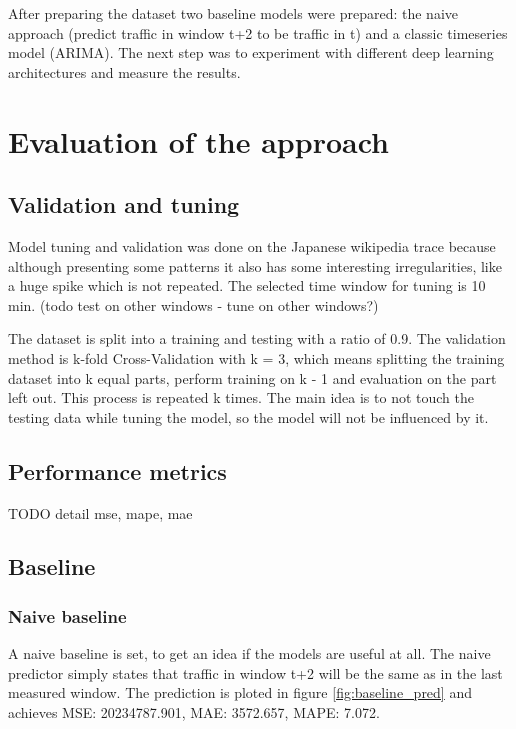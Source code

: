 \documentclass[12pt]{article}
\begin{document}
  After preparing the dataset two baseline models were prepared: the naive 
  approach (predict traffic in window t+2 to be traffic in t) and a classic 
  timeseries model (ARIMA). The next step was to experiment with different 
  deep learning architectures and measure the results.


  \section{Evaluation of the approach}
  \subsection{Validation and tuning}
  Model tuning and validation was done on the Japanese wikipedia trace because 
  although presenting some patterns it also has some interesting irregularities, 
  like a huge spike which is not repeated. The selected time window for tuning 
  is 10 min. (todo test on other windows - tune on other windows?)

  The dataset is split into a training and testing with a ratio of 0.9.
  The validation method is k-fold Cross-Validation\cite{kfold} with k = 3, 
  which means splitting the training dataset into k equal parts, perform training
  on k - 1 and evaluation on the part left out. This process is repeated k times.
  The main idea is to not touch the testing data while tuning the model, so the 
  model will not be influenced by it.

  \subsection{Performance metrics}
  TODO detail mse, mape, mae


  \subsection{Baseline}
  \subsubsection{Naive baseline}
  A naive baseline is set, to get an idea if the models are useful at all. The 
  naive predictor simply states that traffic in window t+2 will be the same as 
  in the last measured window. The prediction is ploted in figure \ref{fig:baseline_pred}
  and achieves MSE: 20234787.901, MAE: 3572.657, MAPE: 7.072.
\end{document}
